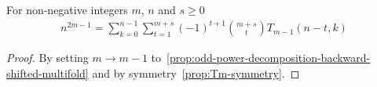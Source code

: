 \begin{corollary}
    \label{cor:odd-power-decomposition-m-1-shifted-multifold}
    For non-negative integers $m$, $n$ and $s \geq 0$
    \begin{align*}
        n^{2m-1} = \sum_{k=0}^{n-1} \sum_{t=1}^{m+s} (-1)^{t+1} \binom{m+s}{t} T_{m-1} (n-t, k)
    \end{align*}
    \begin{proof}
        By setting $m \rightarrow m-1$ to~\eqref{prop:odd-power-decomposition-backward-shifted-multifold}
        and by symmetry~\eqref{prop:Tm-symmetry}.
    \end{proof}
\end{corollary}
